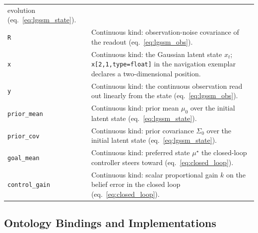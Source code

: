 \documentclass[
  english,
  9pt,
]{extarticle}
\begin{document}
\begin{longtable}[]{@{}
  >{\raggedright\arraybackslash}p{}
  >{\raggedright\arraybackslash}p{}@{}}
evolution (eq.~\ref{eq:lgssm_state}). \\
\texttt{R} & Continuous kind: observation-noise covariance of the
readout (eq.~\ref{eq:lgssm_obs}). \\
\texttt{x} & Continuous kind: the Gaussian latent state \(x_t\);
\texttt{x{[}2,1,type=float{]}} in the navigation exemplar declares a
two-dimensional position. \\
\texttt{y} & Continuous kind: the continuous observation read out
linearly from the state (eq.~\ref{eq:lgssm_obs}). \\
\texttt{prior\_mean} & Continuous kind: prior mean \(\mu_0\) over the
initial latent state (eq.~\ref{eq:lgssm_state}). \\
\texttt{prior\_cov} & Continuous kind: prior covariance \(\Sigma_0\)
over the initial latent state (eq.~\ref{eq:lgssm_state}). \\
\texttt{goal\_mean} & Continuous kind: preferred state \(\mu^\star\) the
closed-loop controller steers toward (eq.~\ref{eq:closed_loop}). \\
\texttt{control\_gain} & Continuous kind: scalar proportional gain \(k\)
on the belief error in the closed loop (eq.~\ref{eq:closed_loop}). \\
\end{longtable}

\subsection{Ontology Bindings and
Implementations}\label{ontology-bindings-and-implementations}
\end{document}
